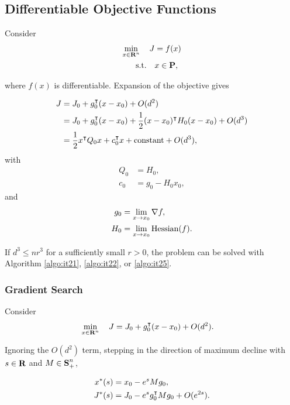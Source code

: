 \documentclass{article}
\begin{document}
\clearpage

\subsection{Differentiable Objective Functions}

    Consider
    \begin{align}
        \min_{x\in\textbf{R}^n}\quad J &= f(x)\\
        \text{s.t.} \quad &x\in\textbf{P},\nonumber
    \end{align}

    where $f(x)$ is differentiable. Expansion of the objective gives

    \begin{align*}
        J &= J_0 + g_0^\intercal(x-x_0) + O(d^2)\\
        &= J_0 + g_0^\intercal(x-x_0)+\frac{1}{2} (x-x_0)^\intercal H_0 (x-x_0)+ O(d^3)\\
        &=\frac{1}{2} x^\intercal Q_0 x+c_0^\intercal x+\text{constant}+ O(d^3),
    \end{align*}
    with
    \begin{align*}
        Q_0&=H_0,\\
        c_0&=g_0-H_0x_0,
    \end{align*}
    and
        \begin{align*}
            g_0&= \lim_{x\to x_0}\nabla f,\\
            H_0&= \lim_{x\to x_0}\text{Hessian}(f).
        \end{align*}

    If $d^3\leq nr^3$ for a sufficiently small $r>0$, the problem
    can be solved with Algorithm \ref{algo:it21}, \ref{algo:it22}, or \ref{algo:it25}.

\subsubsection{Gradient Search}

    Consider
    \begin{align*}
        \min_{x\in\textbf{R}^n}\quad J&=J_0 + g_0^\intercal(x-x_0)+ O(d^2).
    \end{align*}

    Ignoring the $O(d^2)$ term, 
    stepping in the direction of maximum decline with $s\in\textbf{R}$ 
    and $M\in\textbf{S}_+^n$,

    \begin{align*}
        x^*(s) &=x_0-e^sMg_0,\\
        J^*(s) &= J_0 -e^s g_0^\intercal M g_0+O(e^{2s}).
    \end{align*}
\end{document}
